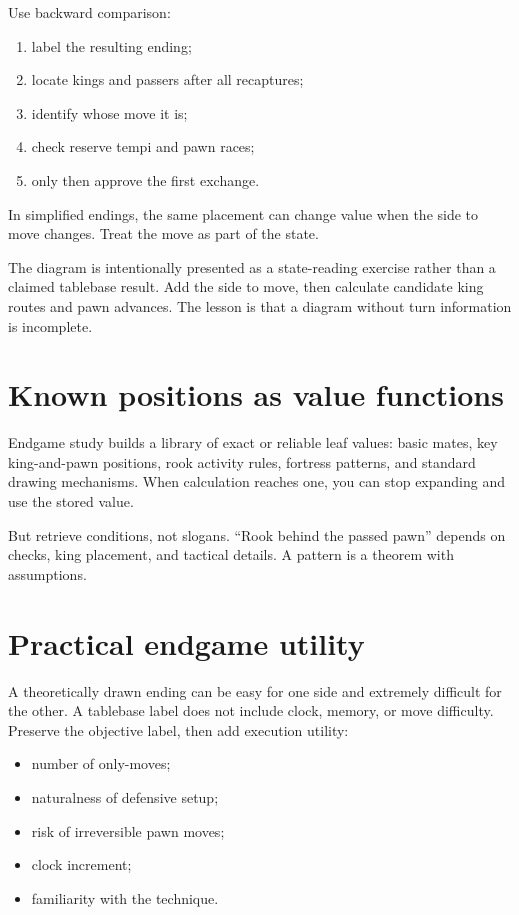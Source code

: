 Use backward comparison:

\begin{enumerate}[leftmargin=1.4em]
\item label the resulting ending;
\item locate kings and passers after all recaptures;
\item identify whose move it is;
\item check reserve tempi and pawn races;
\item only then approve the first exchange.
\end{enumerate}

\begin{positiondiagram}{In simplified endings, the same placement can change value when the side to move changes. Treat the move as part of the state.}
\end{positiondiagram}

The diagram is intentionally presented as a state-reading exercise rather than a claimed tablebase result. Add the side to move, then calculate candidate king routes and pawn advances. The lesson is that a diagram without turn information is incomplete.

\section{Known positions as value functions}
Endgame study builds a library of exact or reliable leaf values: basic mates, key king-and-pawn positions, rook activity rules, fortress patterns, and standard drawing mechanisms. When calculation reaches one, you can stop expanding and use the stored value.

But retrieve conditions, not slogans. ``Rook behind the passed pawn'' depends on checks, king placement, and tactical details. A pattern is a theorem with assumptions.

\section{Practical endgame utility}
A theoretically drawn ending can be easy for one side and extremely difficult for the other. A tablebase label does not include clock, memory, or move difficulty. Preserve the objective label, then add execution utility:

\begin{itemize}[leftmargin=1.4em]
\item number of only-moves;
\item naturalness of defensive setup;
\item risk of irreversible pawn moves;
\item clock increment;
\item familiarity with the technique.
\end{itemize}

